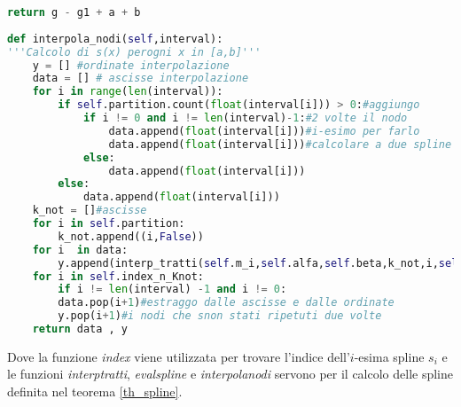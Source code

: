 \documentclass[a4paper,12pt]{report}
\theoremstyle{definition}
\begin{document}
\begin{lstlisting}[language=Python]
	return g - g1 + a + b
	
def interpola_nodi(self,interval):
'''Calcolo di s(x) perogni x in [a,b]'''
	y = [] #ordinate interpolazione
	data = [] # ascisse interpolazione 
	for i in range(len(interval)):
		if self.partition.count(float(interval[i])) > 0:#aggiungo
			if i != 0 and i != len(interval)-1:#2 volte il nodo 
				data.append(float(interval[i]))#i-esimo per farlo
				data.append(float(interval[i]))#calcolare a due spline
			else:
				data.append(float(interval[i]))
		else:
			data.append(float(interval[i]))
	k_not = []#ascisse
	for i in self.partition:
		k_not.append((i,False))
	for i  in data:
		y.append(interp_tratti(self.m_i,self.alfa,self.beta,k_not,i,self.n,len(data),self.h))
	for i in self.index_n_Knot: 
		if i != len(interval) -1 and i != 0:
		data.pop(i+1)#estraggo dalle ascisse e dalle ordinate 
		y.pop(i+1)#i nodi che snon stati ripetuti due volte
	return data , y
\end{lstlisting}
Dove la funzione \textit{index} viene utilizzata per trovare l'indice dell'$i$-esima spline $s_i$ e le funzioni \textit{interptratti}, \textit{evalspline} e \textit{interpolanodi} servono per il calcolo delle spline definita nel teorema \ref{th_spline}.\\
\end{document}

